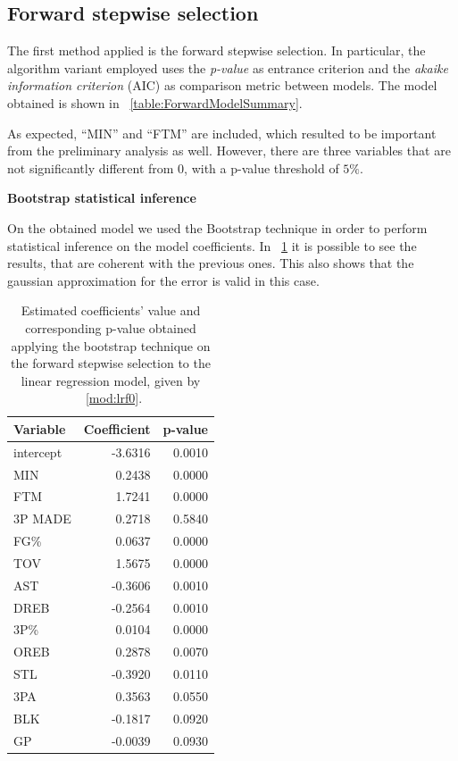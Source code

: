 \subsection{Forward stepwise selection}

The first method applied is the forward stepwise selection. In particular, the algorithm variant employed uses the \textit{p-value} as entrance criterion and the \textit{akaike information criterion} (AIC) as comparison metric between models. The model obtained is shown in \Tab~\ref{table:ForwardModelSummary}.

As expected, ``MIN'' and ``FTM'' are included, which resulted to be important from the preliminary analysis as well. However, there are three variables that are not significantly different from 0, with a p-value threshold of $5\%$.

\vspace{0.2cm}
\noindent
\textbf{Bootstrap statistical inference}

On the obtained model we used the Bootstrap technique in order to perform statistical inference on the model coefficients. In \Tab~\ref{table:BootForwardModel} it is possible to see the results, that are coherent with the previous ones. This also shows that the gaussian approximation for the error is valid in this case. 

\begin{table}[h]
	\centering
	\begin{tabular}{|| l | r | r ||} 
		\hline
		Variable & Coefficient & p-value \\
		\hline
		\hline
		intercept & -3.6316 & 0.0010 \\
		MIN & 0.2438 & 0.0000 \\
		FTM & 1.7241 & 0.0000 \\
		3P MADE & 0.2718 & 0.5840 \\
		FG\% & 0.0637 & 0.0000 \\
		TOV & 1.5675 & 0.0000 \\
		AST & -0.3606 & 0.0010 \\
		DREB & -0.2564 & 0.0010 \\
		3P\% & 0.0104 & 0.0000 \\
		OREB & 0.2878 & 0.0070 \\
		STL & -0.3920 & 0.0110 \\
		3PA & 0.3563 & 0.0550 \\
		BLK & -0.1817 & 0.0920 \\
		GP & -0.0039 & 0.0930 \\
		\hline
	\end{tabular}
	\caption{Estimated coefficients' value and corresponding p-value obtained applying the bootstrap technique on the forward stepwise selection to the linear regression model, given by \Mod~\ref{mod:lrf0}.}
	\label{table:BootForwardModel}
\end{table}


